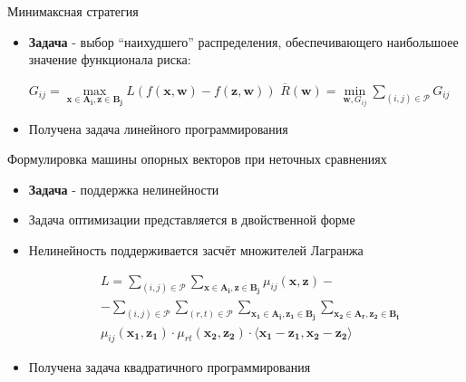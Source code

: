 \documentclass[11pt]{beamer}
\newcommand{\Rho}{%
	\mathcal{P}%
}
\begin{document}
\begin{frame}{Минимаксная стратегия}

\begin{itemize}
	\item \textbf{Задача} - выбор ``наихудшего'' распределения, обеспечивающего наибольшоее значение функционала риска:
	\begin{center}
	\(G_{ij} = \underset{\mathbf{x} \in \mathbf{A_i}, \mathbf{z} \in \mathbf{B_j}}{\operatorname{max}} L (f (\mathbf{x}, \mathbf{w}) - f(\mathbf{z}, \mathbf{w}))\) \linebreak
	\(\overline{R}(\mathbf{w}) = \underset{\mathbf{w}, G_{ij}}{\operatorname{min}} \sum \limits_{(i, j) \in \Rho} G_{ij}\)
	\end{center}
	\item Получена задача линейного программирования
\end{itemize}

\end{frame}
\begin{frame}{Формулировка машины опорных векторов при неточных сравнениях}

\begin{itemize}
	\item \textbf{Задача} - поддержка нелинейности
	\item Задача оптимизации представляется в двойственной форме
	\item Нелинейность поддерживается засчёт множителей Лагранжа
	\begin{center}
\begin{eqnarray*}
&L = \sum \limits_{(i, j) \in \Rho} \sum \limits_{\mathbf{x} \in \mathbf{A_i}, \mathbf{z} \in \mathbf{B_j}} \mu_{ij} (\mathbf{x}, \mathbf{z}) - \\
&- \sum \limits_{(i, j) \in \Rho} \sum \limits_{(r, t) \in \Rho} \sum \limits_{\mathbf{x_1} \in \mathbf{A_i}, \mathbf{z_1} \in \mathbf{B_j}} \sum \limits_{\mathbf{x_2} \in \mathbf{A_r}, \mathbf{z_2} \in \mathbf{B_t}} \\
&\mu_{ij} (\mathbf{x_1}, \mathbf{z_1}) \cdot \mu_{rt} (\mathbf{x_2}, \mathbf{z_2}) \cdot \langle \mathbf{x_1} - \mathbf{z_1}, \mathbf{x_2} - \mathbf{z_2} \rangle
\end{eqnarray*}
	\end{center} \linebreak
	\item Получена задача квадратичного программирования
\end{itemize}

\end{frame}
\end{document}
